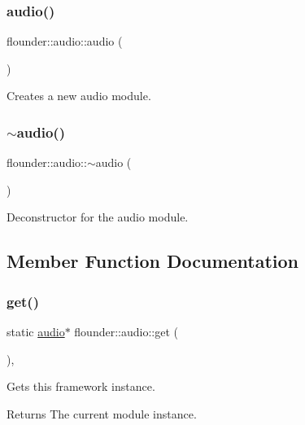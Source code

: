 \subsubsection{\texorpdfstring{audio()}{audio()}}
{\footnotesize\ttfamily flounder\+::audio\+::audio (\begin{DoxyParamCaption}{ }\end{DoxyParamCaption})}



Creates a new audio module. 

\mbox{\label{classflounder_1_1audio_afb4d3bbb9ae399385a3abfe6e4e6d7ee}} 
\subsubsection{\texorpdfstring{$\sim$audio()}{~audio()}}
{\footnotesize\ttfamily flounder\+::audio\+::$\sim$audio (\begin{DoxyParamCaption}{ }\end{DoxyParamCaption})}



Deconstructor for the audio module. 



\subsection{Member Function Documentation}
\mbox{\label{classflounder_1_1audio_ac827774b8855e8a921ef9141c2515df8}} 
\subsubsection{\texorpdfstring{get()}{get()}}
{\footnotesize\ttfamily static \hyperlink{classflounder_1_1audio}{audio}$\ast$ flounder\+::audio\+::get (\begin{DoxyParamCaption}{ }\end{DoxyParamCaption})\hspace{0.3cm}{\ttfamily [inline]}, {\ttfamily [static]}}



Gets this framework instance. 

\begin{DoxyReturn}{Returns}
The current module instance. 
\end{DoxyReturn}
\mbox{\label{classflounder_1_1audio_acc0f4ebb4b42b0ef055ef8dd14f1a9da}} 
